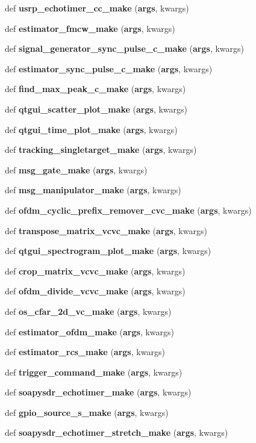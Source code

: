 \begin{DoxyCompactItemize}
\item 
def {\bf usrp\+\_\+echotimer\+\_\+cc\+\_\+make} ({\bf args}, kwargs)
\item 
def {\bf estimator\+\_\+fmcw\+\_\+make} ({\bf args}, kwargs)
\item 
def {\bf signal\+\_\+generator\+\_\+sync\+\_\+pulse\+\_\+c\+\_\+make} ({\bf args}, kwargs)
\item 
def {\bf estimator\+\_\+sync\+\_\+pulse\+\_\+c\+\_\+make} ({\bf args}, kwargs)
\item 
def {\bf find\+\_\+max\+\_\+peak\+\_\+c\+\_\+make} ({\bf args}, kwargs)
\item 
def {\bf qtgui\+\_\+scatter\+\_\+plot\+\_\+make} ({\bf args}, kwargs)
\item 
def {\bf qtgui\+\_\+time\+\_\+plot\+\_\+make} ({\bf args}, kwargs)
\item 
def {\bf tracking\+\_\+singletarget\+\_\+make} ({\bf args}, kwargs)
\item 
def {\bf msg\+\_\+gate\+\_\+make} ({\bf args}, kwargs)
\item 
def {\bf msg\+\_\+manipulator\+\_\+make} ({\bf args}, kwargs)
\item 
def {\bf ofdm\+\_\+cyclic\+\_\+prefix\+\_\+remover\+\_\+cvc\+\_\+make} ({\bf args}, kwargs)
\item 
def {\bf transpose\+\_\+matrix\+\_\+vcvc\+\_\+make} ({\bf args}, kwargs)
\item 
def {\bf qtgui\+\_\+spectrogram\+\_\+plot\+\_\+make} ({\bf args}, kwargs)
\item 
def {\bf crop\+\_\+matrix\+\_\+vcvc\+\_\+make} ({\bf args}, kwargs)
\item 
def {\bf ofdm\+\_\+divide\+\_\+vcvc\+\_\+make} ({\bf args}, kwargs)
\item 
def {\bf os\+\_\+cfar\+\_\+2d\+\_\+vc\+\_\+make} ({\bf args}, kwargs)
\item 
def {\bf estimator\+\_\+ofdm\+\_\+make} ({\bf args}, kwargs)
\item 
def {\bf estimator\+\_\+rcs\+\_\+make} ({\bf args}, kwargs)
\item 
def {\bf trigger\+\_\+command\+\_\+make} ({\bf args}, kwargs)
\item 
def {\bf soapysdr\+\_\+echotimer\+\_\+make} ({\bf args}, kwargs)
\item 
def {\bf gpio\+\_\+source\+\_\+s\+\_\+make} ({\bf args}, kwargs)
\item 
def {\bf soapysdr\+\_\+echotimer\+\_\+stretch\+\_\+make} ({\bf args}, kwargs)
\end{DoxyCompactItemize}

